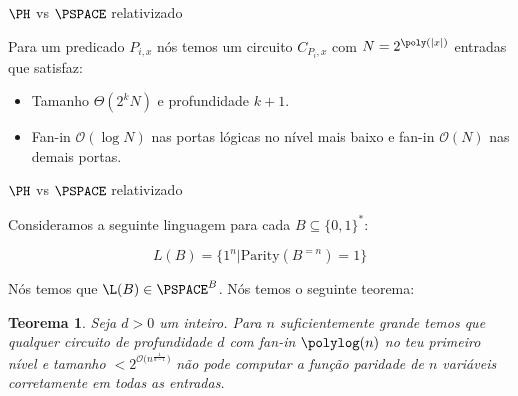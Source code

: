 \documentclass[landscape, 9pt]{beamer}
\newtheorem{teo}{Teorema}
\newcommand{\binalph}{\{0, 1\}}
\newcommand{\Parity}{\text{Parity}}
\begin{document}

\begin{frame} {$\PH$ vs $\PSPACE$ relativizado}

Para um predicado $P_{i, x}$ nós temos um circuito $C_{P_{i}, x}$ com $N = 2^{\poly(\lvert x \rvert)}$ entradas que satisfaz:

\begin{itemize}

	\item Tamanho $\Theta(2^{k}N)$ e profundidade $k + 1$.
	
	\item Fan-in $\mathcal{O}(\log N)$ nas portas lógicas no nível mais baixo e fan-in $\mathcal{O}(N)$ nas demais portas.

\end{itemize}

\end{frame}


\begin{frame} {$\PH$ vs $\PSPACE$ relativizado}

Consideramos a seguinte linguagem para cada $B \subseteq \binalph^{*}$:

\begin{equation*}
	L(B) = \{1^{n} \lvert \Parity(B^{=n}) = 1\}
\end{equation*}

Nós temos que $\L(B) \in \PSPACE^{B}$. Nós temos o seguinte teorema:

\begin{teo}

Seja $d > 0$ um inteiro. Para $n$ suficientemente grande temos que qualquer circuito de profundidade $d$ com fan-in $\polylog(n)$ no teu primeiro nível e tamanho $< 2^{\mathcal{O}\big(n^{\frac{1}{d - 1}}\big)}$ não pode computar a função paridade de $n$ variáveis corretamente em todas as entradas. 

\end{teo}

\end{frame}

\end{document}
